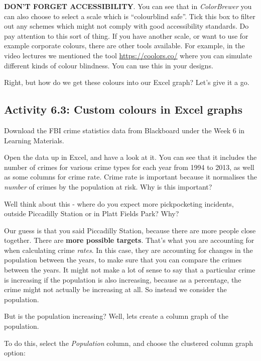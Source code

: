 \documentclass[
]{book}
\begin{document}
\textbf{DON'T FORGET ACCESSIBILITY}. You can see that in \emph{ColorBrewer} you can also choose to select a scale which is ``colourblind safe''. Tick this box to filter out any schemes which might not comply with good accessibility standards. Do pay attention to this sort of thing. If you have another scale, or want to use for example corporate colours, there are other tools available. For example, in the video lectures we mentioned the tool \url{https://coolors.co/} where you can simulate different kinds of colour blindness. You can use this in your designs.

Right, but how do we get these colours into our Excel graph? Let's give it a go.

\hypertarget{activity-6.3-custom-colours-in-excel-graphs}{%
\subsection{Activity 6.3: Custom colours in Excel graphs}\label{activity-6.3-custom-colours-in-excel-graphs}}

Download the FBI crime statistics data from Blackboard under the Week 6 in Learning Materials.

Open the data up in Excel, and have a look at it. You can see that it includes the number of crimes for various crime types for each year from 1994 to 2013, as well as some columns for crime rate. Crime rate is important because it normalises the \emph{number} of crimes by the population at risk. Why is this important?

Well think about this - where do you expect more pickpocketing incidents, outside Piccadilly Station or in Platt Fields Park? Why?

Our guess is that you said Piccadilly Station, because there are more people close together. There are \textbf{more possible targets}. That's what you are accounting for when calculating crime \emph{rates}. In this case, they are accounting for changes in the population between the years, to make sure that you can compare the crimes between the years. It might not make a lot of sense to say that a particular crime is increasing if the population is also increasing, because as a percentage, the crime might not actually be increasing at all. So instead we consider the population.

But is the population increasing? Well, lets create a column graph of the population.

To do this, select the \emph{Population} column, and choose the clustered column graph option:
\end{document}
